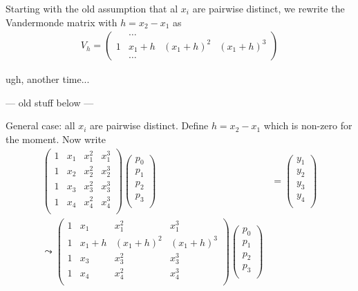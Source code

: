 \documentclass[english,11pt,a4paper]{article}
\begin{document}
Starting with the old assumption that al $x_i$ are pairwise distinct, we rewrite the Vandermonde matrix with $h = x_2 -x_1$ as
\begin{align*}
  V_h =
  \begin{pmatrix}
  & \dots \\
  1 & x_1 + h & (x_1 + h)^2 & (x_1 + h)^3\\
  & \dots
  \end{pmatrix}
\end{align*}

ugh, another time...



\newpage
--- old stuff below ---

General case: all $x_i$ are pairwise distinct. Define $h = x_2 - x_1$ which is non-zero for the moment. Now write
\begin{align*}
  \begin{pmatrix}
  1 & x_1 & x_1^2 & x_1^3\\
  1 & x_2 & x_2^2 & x_2^3\\
  1 & x_3 & x_3^2 & x_3^3\\
  1 & x_4 & x_4^2 & x_4^3\\
  \end{pmatrix}
  \begin{pmatrix}
  p_0 \\
  p_1 \\
  p_2 \\
  p_3 \\
  \end{pmatrix}
  &=
  \begin{pmatrix}
  y_1 \\
  y_2 \\
  y_3 \\
  y_4 \\
  \end{pmatrix}
  \\
  \leadsto
  \begin{pmatrix}
  1 & x_1 & x_1^2 & x_1^3\\
  1 & x_1+h & (x_1+h)^2 & (x_1+h)^3\\
  1 & x_3 & x_3^2 & x_3^3\\
  1 & x_4 & x_4^2 & x_4^3\\
  \end{pmatrix}
  \begin{pmatrix}
  p_0 \\
  p_1 \\
  p_2 \\
  p_3 \\

\end{pmatrix}
\end{align*}
\end{document}
